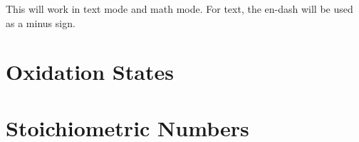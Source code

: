 \documentclass[a4paper,notitlepage,parskip=half]{scrreprt}
\begin{document}
\begin{SideBySideExample}[xrightmargin=2.5cm]
  \ce{[AgCl2]-}
\end{SideBySideExample}

\begin{SideBySideExample}[xrightmargin=2.5cm]
\end{SideBySideExample}

\begin{SideBySideExample}[xrightmargin=2.5cm]
\end{SideBySideExample}

This will work in text mode and math mode. For text, the en-dash will be used as a minus sign.


\section{Oxidation States}

\begin{SideBySideExample}[xrightmargin=2.5cm]
\end{SideBySideExample}

\section{Stoichiometric Numbers}

\begin{SideBySideExample}[xrightmargin=2.5cm]
\end{SideBySideExample}

\begin{SideBySideExample}[xrightmargin=2.5cm]
\end{SideBySideExample}

\begin{SideBySideExample}[xrightmargin=2.5cm]
\end{SideBySideExample}

\begin{SideBySideExample}[xrightmargin=2.5cm]
\end{SideBySideExample}

\begin{SideBySideExample}[xrightmargin=2.5cm]
\end{SideBySideExample}

\begin{SideBySideExample}[xrightmargin=2.5cm]
\end{SideBySideExample}
\end{document}
